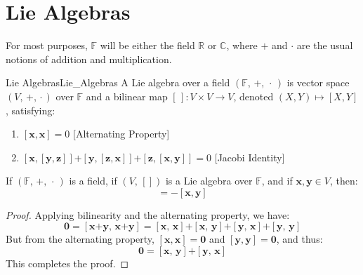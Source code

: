 \section{Lie Algebras}
    For most purposes, $\mathbb{F}$ will be either the field $\mathbb{R}$
    or $\mathbb{C}$, where $+$ and $\cdot$ are the usual notions of
    addition and multiplication.
    \begin{fdefinition}{Lie Algebras}{Lie_Algebras}
        A Lie algebra over a field $(\mathbb{F},\,+,\,\cdot\,)$
        is vector space $(V,\,\boldsymbol{+},\,\boldsymbol{\cdot}\,)$
        over $\mathbb{F}$ and a bilinear map
        $[\,]:V\times{V}\rightarrow{V}$, denoted $(X,Y)\mapsto[X,Y]$,
        satisfying:
        \begin{enumerate}
            \item $[\mathbf{x},\mathbf{x}]=0$
                  \hfill[Alternating Property]
            \item $[\mathbf{x},[\mathbf{y},\mathbf{z}]]%
                   \boldsymbol{+}[\mathbf{y},[\mathbf{z},\mathbf{x}]]%
                   \boldsymbol{+}[\mathbf{z},[\mathbf{x},\mathbf{y}]]=0$
                  \hfill[Jacobi Identity]
        \end{enumerate}
    \end{fdefinition}
    \begin{theorem}
        \label{thm:Lie_Bracket_Anti_Commutes}%
        If $(\mathbb{F},\,+,\,\cdot\,)$ is a field, if $(V,\,[])$ is a
        Lie algebra over $\mathbb{F}$, and if
        $\mathbf{x},\mathbf{y}\in{V}$, then:
        \begin{equation}
            [\mathbf{x},\mathbf{y}]=\minus[\mathbf{x},\mathbf{y}]
        \end{equation}
    \end{theorem}
    \begin{proof}
        Applying bilinearity and the alternating property, we have:
        \begin{equation}
            \mathbf{0}=[\mathbf{x}\boldsymbol{+}\mathbf{y},\,
                        \mathbf{x}\boldsymbol{+}\mathbf{y}]
                      =[\mathbf{x},\,\mathbf{x}]\boldsymbol{+}
                       [\mathbf{x},\,\mathbf{y}]\boldsymbol{+}
                       [\mathbf{y},\,\mathbf{x}]\boldsymbol{+}
                       [\mathbf{y},\,\mathbf{y}]
        \end{equation}
        But from the alternating property,
        $[\mathbf{x},\mathbf{x}]=\mathbf{0}$ and
        $[\mathbf{y},\mathbf{y}]=\mathbf{0}$, and thus:
        \begin{equation}
            \mathbf{0}=[\mathbf{x},\,\mathbf{y}]\boldsymbol{+}
                       [\mathbf{y},\,\mathbf{x}]
        \end{equation}
        This completes the proof.
    \end{proof}
